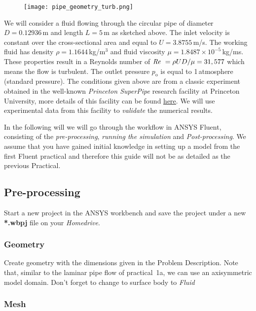 \documentclass[11pt,a4paper,oneside]{scrartcl}
\newcommand\Rey{\mbox{\textit{Re}}\,\,}
\newcommand\bfr[1]{\textcolor[rgb]{1,0.00,0.00}{\textbf{\textsf{#1}}}}
\begin{document}
\begin{figure}[H]
\begin{center}
    \texttt{[image: pipe\_geometry\_turb.png]}
\end{center}
\end{figure}

We will consider a fluid flowing through the circular pipe of diameter $D=0.12936$\,m and length $L=5$\,m as sketched above. The inlet velocity is constant over the cross-sectional area and equal to $U=3.8755$\,m/s. The working fluid  has density $\rho=1.1644$\,kg/m$^3$ and fluid viscosity $\mu=1.8487\times10^{-5}$\,kg/ms. These properties result in a Reynolds number of $\Rey=\rho UD/\mu=31,577$ which means the flow is turbulent. The outlet pressure $p_\mathrm{o}$ is equal to 1\,atmosphere (standard pressure). The conditions given above are from a classic experiment obtained in the well-known \emph{Princeton SuperPipe} research facility at Princeton University, more details of this facility can be found \href{http://www.princeton.edu/~gasdyn/Facilities/Facilities.html#SuperPipe}{\underline{here}}. We will use experimental data from this facility to \emph{validate} the numerical results.

In the following will we will go through the workflow in ANSYS Fluent, consisting of the \emph{pre-processing}, \emph{running the simulation} and \emph{Post-processing}. We assume that you have gained initial knowledge in setting up a model from the first Fluent practical and therefore this guide will not be as detailed as the previous Practical.


\subsection{Pre-processing}

Start a new project in the ANSYS workbench and save the project under a new \bfr{*.wbpj} file on your \emph{Homedrive}.

\subsubsection*{Geometry}
Create geometry with the dimensions given in the Problem Description. Note that, similar to the laminar pipe flow of practical~1a, we can use an axisymmetric model domain. Don't forget to change to surface body to \emph{Fluid}

\subsubsection*{Mesh}
\end{document}
